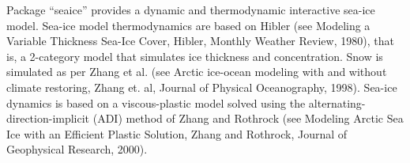
Package ``seaice'' provides a dynamic and thermodynamic interactive sea-ice
model.  Sea-ice model thermodynamics are based on Hibler (see Modeling a Variable Thickness Sea-Ice Cover, Hibler, Monthly Weather Review, 1980), 
that is, a 2-category model that simulates ice thickness and concentration.  
Snow is simulated as per Zhang et al. (see Arctic ice-ocean modeling with
and without climate restoring, Zhang et. al, Journal of Physical Oceanography,
1998).  
Sea-ice dynamics is based
on a viscous-plastic model solved using the alternating-direction-implicit (ADI) method of
Zhang and Rothrock (see Modeling Arctic Sea Ice with an Efficient Plastic 
Solution, Zhang and Rothrock, Journal of Geophysical Research, 2000).
